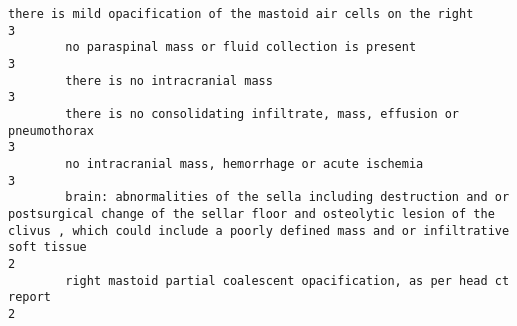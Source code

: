 \documentclass[11pt]{article}
\begin{document}
\begin{Verbatim}[commandchars=\\\{\}]
        there is mild opacification of the mastoid air cells on the right                                                                                                                                                                                                                                                                                                                                                               3
        no paraspinal mass or fluid collection is present                                                                                                                                                                                                                                                                                                                                                                               3
        there is no intracranial mass                                                                                                                                                                                                                                                                                                                                                                                                   3
        there is no consolidating infiltrate, mass, effusion or pneumothorax                                                                                                                                                                                                                                                                                                                                                            3
        no intracranial mass, hemorrhage or acute ischemia                                                                                                                                                                                                                                                                                                                                                                              3
        brain: abnormalities of the sella including destruction and or postsurgical change of the sellar floor and osteolytic lesion of the clivus , which could include a poorly defined mass and or infiltrative soft tissue                                                                                                                                                                                                          2
        right mastoid partial coalescent opacification, as per head ct report                                                                                                                                                                                                                                                                                                                                                           2

\end{Verbatim}
\end{document}
